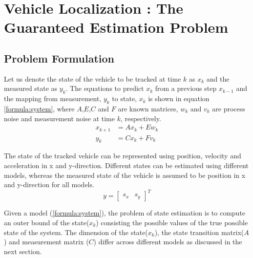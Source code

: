 \chapter{Vehicle Localization : The Guaranteed Estimation Problem} \label{ch:problem}
\section{Problem Formulation}
Let us denote the state of the vehicle to be tracked at time $k$ as $x_k$ and the measured state as $y_k$. The equations to predict $x_k$ from a previous step $x_{k-1}$ and the mapping from measurement, $y_k$ to state, $x_k$ is shown in equation \eqref{formula:system}, where $A$,$E$,$C$ and $F$ are known matrices, $w_k$ and $v_k$ are process noise and measurement noise at time $k$, respectively. 
\begin{equation}
\label{formula:system}
\begin{split}
x_{k+1} &= Ax_k + Ew_k\\
y_k &= Cx_k + Fv_k
\end{split}
\end{equation}

The state of the tracked vehicle can be represented using position, velocity and acceleration in x and y-direction. Different states can be estimated using different models, whereas the measured state of the vehicle is assumed to be position in x and y-direction for all models.
\begin{equation*}
y =[ 
\begin{matrix}
s_x & s_y
\end{matrix}
]^T
\end{equation*}


Given a model (\eqref{formula:system}), the problem of state estimation is to compute an outer bound of the state($x_k$) consisting the possible values of the true possible state of the system. The dimension of the state($x_k$), the state transition matrix($A$) and measurement matrix ($C$) differ across different models as discussed in the next section.

